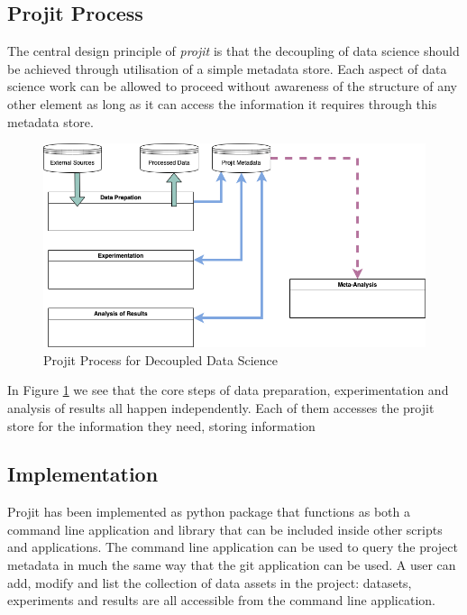 \documentclass[sigconf]{acmart}
\begin{document}
\subsection{Projit Process}

The central design principle of \textit{projit} is that the decoupling of data science 
should be achieved through utilisation of a simple metadata store. Each aspect of 
data science work can be allowed to proceed without awareness of the structure of 
any other element as long as it can access the information it requires through this
metadata store.

\begin{figure}
\includegraphics[scale=0.6]{./Projit_decoupled_process.drawio.png}
\caption{Projit Process for Decoupled Data Science}
\label{fig:projit}
\end{figure}

In Figure \ref{fig:projit} we see that the core steps of data preparation, experimentation
and analysis of results all happen independently. Each of them accesses the projit store for
the information they need, storing information 

\subsection{Implementation}

Projit has been implemented as python package that functions as both a command line application
and library that can be included inside other scripts and applications. The command line application
can be used to query the project metadata in much the same way that the git application can be used.
A user can add, modify and list the collection of data assets in the project: datasets, experiments 
and results are all accessible from the command line application.
\end{document}
